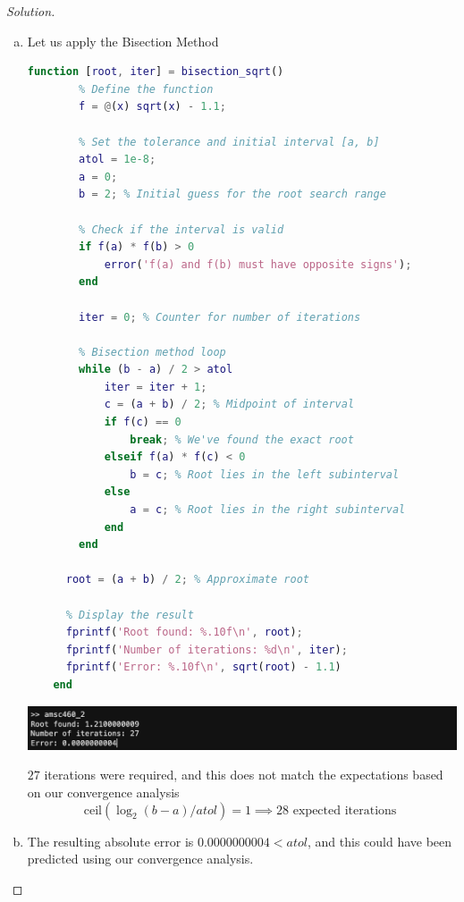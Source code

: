\documentclass[12pt]{scrartcl}
\begin{document}
\begin{proof}[Solution]
  \hfill

  \begin{enumerate}[(a)]
    \item Let us apply the Bisection Method 
    
    \begin{lstlisting}[language=Matlab]
      function [root, iter] = bisection_sqrt()
        % Define the function
        f = @(x) sqrt(x) - 1.1;
        
        % Set the tolerance and initial interval [a, b]
        atol = 1e-8;
        a = 0;
        b = 2; % Initial guess for the root search range
        
        % Check if the interval is valid
        if f(a) * f(b) > 0
            error('f(a) and f(b) must have opposite signs');
        end
        
        iter = 0; % Counter for number of iterations
        
        % Bisection method loop
        while (b - a) / 2 > atol
            iter = iter + 1;
            c = (a + b) / 2; % Midpoint of interval
            if f(c) == 0
                break; % We've found the exact root
            elseif f(a) * f(c) < 0
                b = c; % Root lies in the left subinterval
            else
                a = c; % Root lies in the right subinterval
            end
        end
      
      root = (a + b) / 2; % Approximate root
      
      % Display the result
      fprintf('Root found: %.10f\n', root);
      fprintf('Number of iterations: %d\n', iter);
      fprintf('Error: %.10f\n', sqrt(root) - 1.1)
    end
    \end{lstlisting}

    \includegraphics[width=14cm]{root_found.png}

    $27$ iterations were required, and this does not match the expectations based on our convergence analysis
    \[\text{ceil}(\log_2(b - a) / atol) = 1 \implies 28 \text{ expected iterations }\]

  \item The resulting absolute error is $0.0000000004 < atol$, and this could have been predicted using our convergence analysis.
\end{enumerate}

\end{proof}
\end{document}

